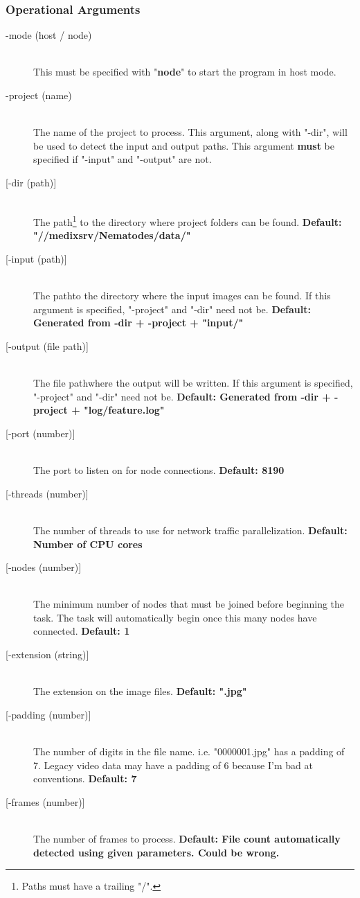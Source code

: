\documentclass[]{article}
\begin{document}
\subsubsection{Operational Arguments}
\begin{description}
	\item[-mode (host / node)] \hfill \\
	This must be specified with "\textbf{node}" to start the program in host mode.
	\item[-project (name)] \hfill \\
	The name of the project to process. This argument, along with "-dir", will be used to detect the input and output paths. This argument \textbf{must} be specified if "-input" and "-output" are not.
	\item[{[-dir (path)]}] \hfill \\
	The path\footnote{\label{pathnote}Paths must have a trailing "/".} to the directory where project folders can be found. \textbf{Default: "//medixsrv/Nematodes/data/"}
	\item[{[-input (path)]}] \hfill \\
	The path\footnotemark[\ref{pathnote}] to the directory where the input images can be found. If this argument is specified, "-project" and "-dir" need not be. \textbf{Default: Generated from -dir + -project + "input/"}
	\item[{[-output (file path)]}] \hfill \\
	The file path\footnotemark[\ref{pathnote}] where the output will be written. If this argument is specified, "-project" and "-dir" need not be. \textbf{Default: Generated from -dir + -project + "log/feature.log"}
	\item[{[-port (number)]}] \hfill \\
	The port to listen on for node connections. \textbf{Default: 8190}
	\item[{[-threads (number)]}] \hfill \\
	The number of threads to use for network traffic parallelization. \textbf{Default: Number of CPU cores}
	\item[{[-nodes (number)]}] \hfill \\
	The minimum number of nodes that must be joined before beginning the task. The task will automatically begin once this many nodes have connected. \textbf{Default: 1}
	\item[{[-extension (string)]}] \hfill \\
	The extension on the image files. \textbf{Default: ".jpg"}
	\item[{[-padding (number)]}] \hfill \\
	The number of digits in the file name. i.e. "0000001.jpg" has a padding of 7. Legacy video data may have a padding of 6 because I'm bad at conventions. \textbf{Default: 7}
	\item[{[-frames (number)]}] \hfill \\
	The number of frames to process.  \textbf{Default: File count automatically detected using given parameters. Could be wrong.}
\end{description}
\end{document}
